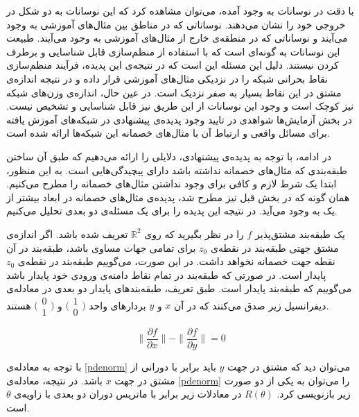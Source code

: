 \documentclass[12pt,onecolumn,a4paper]{article}
\begin{document}
با دقت در نوسانات به وجود آمده، می‌توان مشاهده کرد که این نوسانات به دو شکل در خروجی خود را نشان می‌دهند. نوساناتی که در مناطق بین مثال‌های آموزشی به وجود می‌آیند و نوساناتی که در منطقه‌ی خارج از مثال‌های آموزشی به وجود می‌آیند. طبیعت این نوسانات به گونه‌ای است که با استفاده از منظم‌سازی قابل شناسایی و برطرف کردن نیستند. دلیل این مسئله این است که در نتیجه‌ی این پدیده، فرآیند منظم‌سازی نقاط بحرانی شبکه را در نزدیکی مثال‌های آموزشی قرار داده و در نتیجه اندازه‌ی مشتق در این نقاط بسیار به صفر نزدیک است. در عین حال، اندازه‌ی وزن‌های شبکه نیز کوچک است و وجود این نوسانات از این طریق نیز قابل شناسایی و تشخیص نیست. در بخش آزمایش‌ها شواهدی در تایید وجود پدیده‌ی پیشنهادی در شبکه‌های آموزش یافته برای مسائل واقعی و ارتباط آن با مثال‌های خصمانه این شبکه‌ها ارائه شده است.

در ادامه، با توجه به پدیده‌ی پیشنهادی، دلایلی را ارائه می‌دهیم که طبق آن ساختن طبقه‌بندی که مثال‌های خصمانه نداشته باشد دارای پیچیدگی‌هایی است. به این منظور، ابتدا یک شرط لازم و کافی برای وجود نداشتن مثال‌های خصمانه را مطرح می‌کنیم. همان گونه که در بخش قبل نیز مطرح شد، پدیده‌ی مثال‌های خصمانه در ابعاد بیشتر از یک به وجود می‌آید. در نتیجه این پدیده را برای یک مسئله‌ی دو بعدی تحلیل می‌کنیم.

یک طبقه‌بند مشتق‌پذیر 
$f$ 
را در نظر بگیرید که روی 
$\mathbb{R}^2$ 
تعریف شده باشد. اگر اندازه‌ی مشتق جهتی طبقه‌بند در نقطه‌ی 
$z_0$ 
برای تمامی جهات مساوی باشد، طبقه‌بند در آن نقطه جهت خصمانه نخواهد داشت. در این صورت، می‌گوییم طبقه‌بند در نقطه‌ی 
$z_0$ 
پایدار است. در صورتی که طبقه‌بند در تمام نقاط دامنه‌ی ورودی خود پایدار باشد می‌گوییم که طبقه‌بند پایدار است. طبق تعریف، طبقه‌بندهای پایدار دو بعدی در معادله‌ی دیفرانسیل زیر صدق می‌کنند که در آن $x$ و $y$ 
بردارهای واحد $\bigl(\begin{smallmatrix}
    1 \\ 0
    \end{smallmatrix} \bigr)$ و $\bigl(\begin{smallmatrix}
        0 \\ 1
        \end{smallmatrix} \bigr)$ 
هستند.

\begin{equation}
    \label{pdenorm}
    \|\frac{\partial f}{\partial x}\| - \|\frac{\partial f}{\partial y}\|=0
\end{equation}

با توجه به معادله‌ی \ref{pdenorm} 
می‌توان دید که مشتق در جهت $y$ 
باید برابر با دورانی از مشتق در جهت $x$ 
باشد. در نتیجه، معادله‌ی \ref{pdenorm} 
را می‌توان به یکی از دو صورت زیر بازنویسی کرد. 
$R(\theta)$ 
در معادلات زیر برابر با ماتریس دوران دو بعدی با زاویه‌ی $\theta$ 
است.
\end{document}
